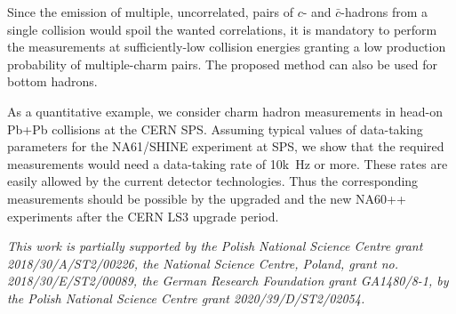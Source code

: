 \documentclass[floatfix,superscriptaddress,a4paper,
               showpieces,showkeys,nofootinbib,preprint]{revtex4-2}
\begin{document}
Since the emission of multiple, uncorrelated, pairs of $c$- and $\bar{c}$-hadrons
from a single collision would spoil the wanted correlations, it is mandatory to perform the measurements at sufficiently-low collision energies granting a low production probability of multiple-charm pairs. 
The proposed method can also be used for bottom hadrons.

As a quantitative example, we consider charm hadron measurements in head-on Pb+Pb collisions at the CERN SPS. Assuming typical values of data-taking parameters for the NA61/SHINE experiment at SPS, we show that the required measurements would need
a data-taking rate of 10k~Hz or more. These rates are easily allowed by the current detector technologies. Thus the corresponding measurements should be possible by the upgraded \NASixtyOne and the new NA60++ experiments after the CERN LS3 upgrade period.


\begin{acknowledgments} 
\itshape{
This work is partially supported by
the Polish National Science Centre grant 2018/30/A/ST2/00226, the National Science Centre, Poland, grant no. 2018/30/E/ST2/00089, the German Research Foundation grant GA1480\slash 8-1, by the Polish National Science Centre grant 2020/39/D/ST2/02054.
}

\end{acknowledgments}
\clearpage


\newpage


\end{document}
